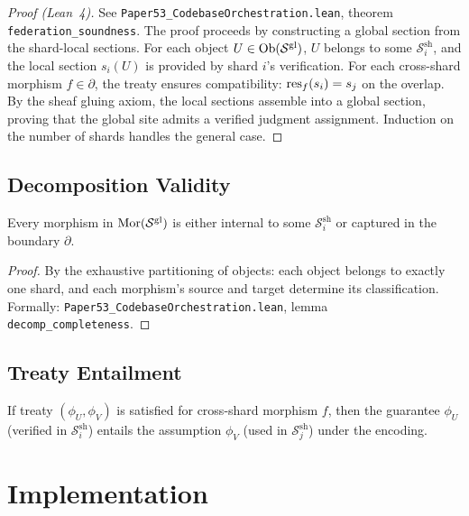 \documentclass[11pt]{article}
\newcommand{\ShardSite}{\mathcal{S}^{\mathrm{sh}}}
\newcommand{\GlobalSite}{\mathcal{S}^{\mathrm{gl}}}
\begin{document}
\begin{proof}[Proof (Lean~4)]
See \texttt{Paper53\_CodebaseOrchestration.lean}, theorem
\texttt{federation\_soundness}.  The proof proceeds by constructing a
global section from the shard-local sections.  For each object $U \in
\Ob(\GlobalSite)$, $U$ belongs to some $\ShardSite_i$, and the local
section $s_i(U)$ is provided by shard $i$'s verification.  For each
cross-shard morphism $f \in \partial$, the treaty ensures compatibility:
$\mathrm{res}_f(s_i) = s_j$ on the overlap.  By the sheaf gluing axiom, the
local sections assemble into a global section, proving that the
global site admits a verified judgment assignment.  Induction on the
number of shards handles the general case.
\end{proof}

\subsection{Decomposition Validity}

\begin{lemma}\label{lem:decomp-complete}
Every morphism in $\Mor(\GlobalSite)$ is either internal to some
$\ShardSite_i$ or captured in the boundary $\partial$.
\end{lemma}

\begin{proof}
By the exhaustive partitioning of objects: each object belongs to
exactly one shard, and each morphism's source and target determine
its classification.  Formally: \texttt{Paper53\_CodebaseOrchestration.lean},
lemma \texttt{decomp\_completeness}.
\end{proof}

\subsection{Treaty Entailment}

\begin{lemma}\label{lem:treaty-consistent}
If treaty $(\phi_U, \phi_V)$ is satisfied for cross-shard morphism
$f$, then the guarantee $\phi_U$ (verified in $\ShardSite_i$) entails
the assumption $\phi_V$ (used in $\ShardSite_j$) under the encoding.
\end{lemma}

\section{Implementation}\label{sec:implementation}
\end{document}
